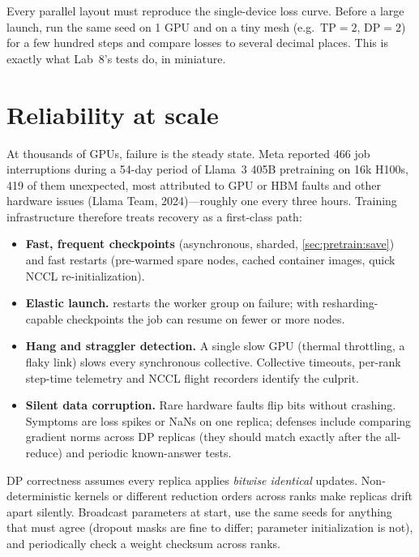 \begin{pitfall}
Every parallel layout must reproduce the single-device loss curve. Before a large launch, run
the same seed on 1 GPU and on a tiny mesh (e.g.\ $\text{TP}=2$, $\text{DP}=2$) for a few hundred
steps and compare losses to several decimal places. This is exactly what Lab~8's tests do, in
miniature.
\end{pitfall}

\section{Reliability at scale}\label{sec:dist:reliability}

At thousands of GPUs, failure is the steady state. Meta reported 466 job interruptions during
a 54-day period of Llama~3 405B pretraining on 16k H100s, 419 of them unexpected, most
attributed to GPU or HBM faults and other hardware issues (Llama Team, 2024)---roughly one every
three hours. Training infrastructure therefore treats recovery as a first-class path:
\begin{itemize}
\item \textbf{Fast, frequent checkpoints} (asynchronous, sharded, \cref{sec:pretrain:save}) and
  fast restarts (pre-warmed spare nodes, cached container images, quick NCCL
  re-initialization).
\item \textbf{Elastic launch.}  restarts the worker group on failure; with
  resharding-capable checkpoints the job can resume on fewer or more nodes.
\item \textbf{Hang and straggler detection.} A single slow GPU (thermal throttling, a flaky
  link) slows every synchronous collective. Collective timeouts, per-rank step-time telemetry
  and NCCL flight recorders identify the culprit.
\item \textbf{Silent data corruption.} Rare hardware faults flip bits without crashing.
  Symptoms are loss spikes or NaNs on one replica; defenses include comparing gradient norms
  across DP replicas (they should match exactly after the all-reduce) and periodic
  known-answer tests.
\end{itemize}

\begin{pitfall}
DP correctness assumes every replica applies \emph{bitwise identical} updates. Non-deterministic
kernels or different reduction orders across ranks make replicas drift apart silently. Broadcast
parameters at start, use the same seeds for anything that must agree (dropout masks are fine to
differ; parameter initialization is not), and periodically check a weight checksum across ranks.
\end{pitfall}

